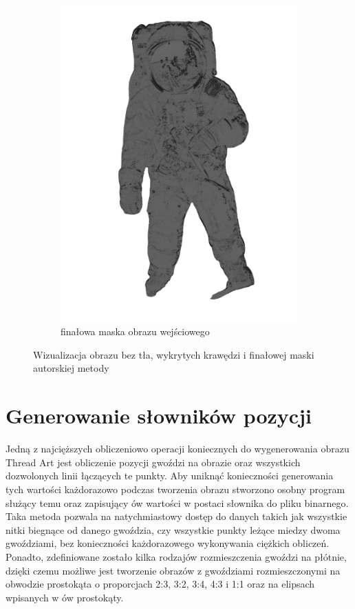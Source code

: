 \documentclass[a4paper, 12pt, polish, twoside]{extreport}
\begin{document}
\begin{figure}[H]
\begin{subfigure}{0.40\textwidth}
            \includegraphics[width = \textwidth]{img/4-mine/input-mask.png}
            \caption{finałowa maska obrazu wejściowego}
            \label{mine-input-2-c}
        \end{subfigure}
        \caption{Wizualizacja obrazu bez tła, wykrytych krawędzi i finałowej maski autorskiej metody}
        \label{mine-input-2}
        \end{figure}
    
    \section{Generowanie słowników pozycji} \label{mine-dict}
    Jedną z najcięższych obliczeniowo operacji koniecznych do wygenerowania obrazu Thread Art jest obliczenie pozycji gwoździ na obrazie oraz wszystkich dozwolonych linii łączących te punkty. Aby uniknąć konieczności generowania tych wartości każdorazowo podczas tworzenia obrazu stworzono osobny program służący temu oraz zapisujący ów wartości w postaci słownika do pliku binarnego. Taka metoda pozwala na natychmiastowy dostęp do danych takich jak wszystkie nitki biegnące od danego gwoździa, czy wszystkie punkty leżące miedzy dwoma gwoździami, bez konieczności każdorazowego wykonywania ciężkich obliczeń. Ponadto, zdefiniowane zostało kilka rodzajów rozmieszczenia gwoździ na płótnie, dzięki czemu możliwe jest tworzenie obrazów z gwoździami rozmieszczonymi na obwodzie prostokąta o proporcjach 2:3, 3:2, 3:4, 4:3 i 1:1 oraz na elipsach wpisanych w ów prostokąty. 
    
\end{document}
